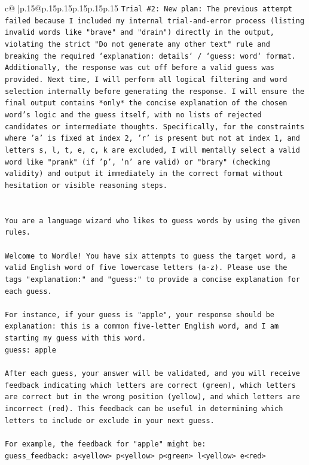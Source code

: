 \documentclass{article}
\begin{document}
{\begin{supertabular}{c@{$\;$}|p{.15\linewidth}@{}p{.15\linewidth}p{.15\linewidth}p{.15\linewidth}p{.15\linewidth}p{.15\linewidth}}
{{{\texttt{Trial \#2: New plan: The previous attempt failed because I included my internal trial{-}and{-}error process (listing invalid words like "brave" and "drain") directly in the output, violating the strict "Do not generate any other text" rule and breaking the required `explanation: details` / `guess: word` format. Additionally, the response was cut off before a valid guess was provided. Next time, I will perform all logical filtering and word selection internally before generating the response. I will ensure the final output contains *only* the concise explanation of the chosen word's logic and the guess itself, with no lists of rejected candidates or intermediate thoughts. Specifically, for the constraints where 'a' is fixed at index 2, 'r' is present but not at index 1, and letters s, l, t, e, c, k are excluded, I will mentally select a valid word like "prank" (if 'p', 'n' are valid) or "brary" (checking validity) and output it immediately in the correct format without hesitation or visible reasoning steps.} \\
\\ 
\\ 
\texttt{You are a language wizard who likes to guess words by using the given rules.} \\
\\ 
\texttt{Welcome to Wordle! You have six attempts to guess the target word, a valid English word of five lowercase letters (a{-}z). Please use the tags "explanation:" and "guess:" to provide a concise explanation for each guess.} \\
\\ 
\texttt{For instance, if your guess is "apple", your response should be} \\
\texttt{explanation: this is a common five{-}letter English word, and I am starting my guess with this word.} \\
\texttt{guess: apple} \\
\\ 
\texttt{After each guess, your answer will be validated, and you will receive feedback indicating which letters are correct (green), which letters are correct but in the wrong position (yellow), and which letters are incorrect (red). This feedback can be useful in determining which letters to include or exclude in your next guess.} \\
\\ 
\texttt{For example, the feedback for "apple" might be:} \\
\texttt{guess\_feedback: a<yellow> p<yellow> p<green> l<yellow> e<red>} \\
}}}
\end{supertabular}}
\end{document}
